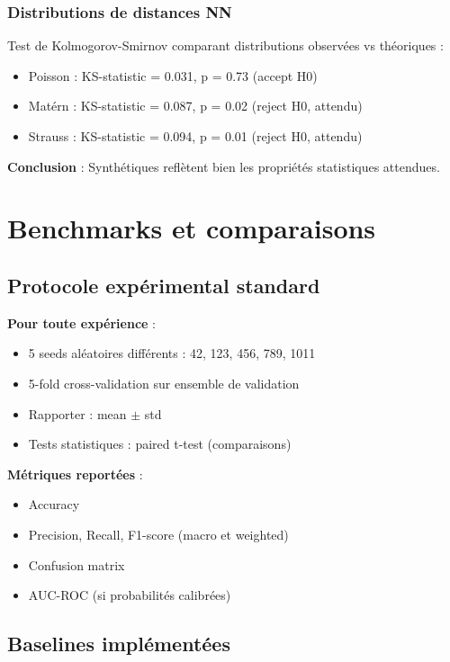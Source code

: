 \subsubsection{Distributions de distances NN}

Test de Kolmogorov-Smirnov comparant distributions observées vs théoriques :
\begin{itemize}
    \item Poisson : KS-statistic = 0.031, p = 0.73 (accept H0)
    \item Matérn : KS-statistic = 0.087, p = 0.02 (reject H0, attendu)
    \item Strauss : KS-statistic = 0.094, p = 0.01 (reject H0, attendu)
\end{itemize}

\textbf{Conclusion} : Synthétiques reflètent bien les propriétés statistiques attendues.

\section{Benchmarks et comparaisons}

\subsection{Protocole expérimental standard}

\textbf{Pour toute expérience} :
\begin{itemize}
    \item 5 seeds aléatoires différents : 42, 123, 456, 789, 1011
    \item 5-fold cross-validation sur ensemble de validation
    \item Rapporter : mean $\pm$ std
    \item Tests statistiques : paired t-test (comparaisons)
\end{itemize}

\textbf{Métriques reportées} :
\begin{itemize}
    \item Accuracy
    \item Precision, Recall, F1-score (macro et weighted)
    \item Confusion matrix
    \item AUC-ROC (si probabilités calibrées)
\end{itemize}

\subsection{Baselines implémentées}

